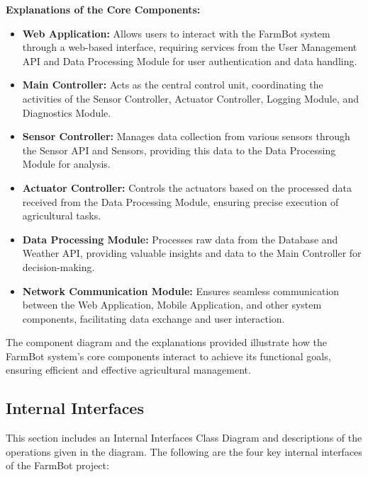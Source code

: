 \textbf{Explanations of the Core Components:}

\begin{itemize}
    \item \textbf{Web Application:} Allows users to interact with the FarmBot system through a web-based interface, requiring services from the User Management API and Data Processing Module for user authentication and data handling.

    \item \textbf{Main Controller:} Acts as the central control unit, coordinating the activities of the Sensor Controller, Actuator Controller, Logging Module, and Diagnostics Module.

    \item \textbf{Sensor Controller:} Manages data collection from various sensors through the Sensor API and Sensors, providing this data to the Data Processing Module for analysis.

    \item \textbf{Actuator Controller:} Controls the actuators based on the processed data received from the Data Processing Module, ensuring precise execution of agricultural tasks.

    \item \textbf{Data Processing Module:} Processes raw data from the Database and Weather API, providing valuable insights and data to the Main Controller for decision-making.

    \item \textbf{Network Communication Module:} Ensures seamless communication between the Web Application, Mobile Application, and other system components, facilitating data exchange and user interaction.
\end{itemize}

The component diagram and the explanations provided illustrate how the FarmBot system's core components interact to achieve its functional goals, ensuring efficient and effective agricultural management.




\subsection{Internal Interfaces}

This section includes an Internal Interfaces Class Diagram and descriptions of the operations given in the diagram. The following are the four key internal interfaces of the FarmBot project:

